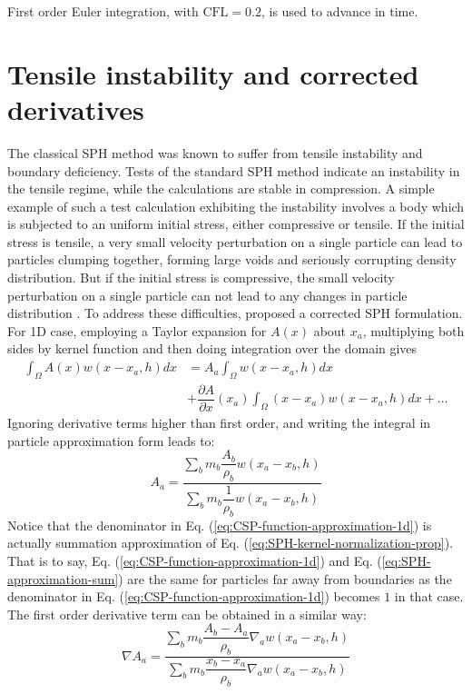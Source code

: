 First order Euler integration, with $\textrm{CFL} = 0.2$, is used to advance in time.

\section{Tensile instability and corrected derivatives}
The classical SPH method was known to suffer from tensile instability and boundary deficiency. Tests of the standard SPH method indicate an instability in the tensile regime, while the calculations are stable in compression.  A simple example of such a test calculation exhibiting the instability involves a body which is subjected to an uniform initial stress, either compressive or tensile. If the initial stress is tensile, a very small velocity perturbation on a single particle can lead to particles clumping together, forming large voids and seriously corrupting density distribution. But if the initial stress is compressive, the small velocity perturbation on a single particle can not lead to any changes in particle distribution \citep{swegle1995smoothed}. To address these difficulties, \citep{chen1999improvement} proposed a corrected SPH formulation. For 1D case, employing a Taylor expansion for $A\left(x\right)$ about $x_a$, multiplying both sides by kernel function and then doing integration over the domain gives
\begin{equation}
\begin{split}
\int_{\Omega} A\left(x\right) w\left(x- x_a, h\right) dx 
& = A_a \int_{\Omega} w\left(x - x_a, h\right) dx \\
&+\dfrac{\partial A}{\partial x}(x_a) \int_{\Omega} \left(x-x_a\right) w\left(x - x_a, h\right) dx +...
\end{split}
\end{equation}
Ignoring derivative terms higher than first order, and writing the integral in particle approximation form leads to:
\begin{equation}
A_a = \frac{\sum_b m_b \dfrac{A_b}{\rho_b} w\left(x_a-x_b, h\right)}{\sum_b m_b \dfrac{1}{\rho_b} w\left(x_a-x_b, h\right)}
\label{eq:CSP-function-approximation-1d}
\end{equation}
Notice that the denominator in Eq. (\ref{eq:CSP-function-approximation-1d}) is actually summation approximation of Eq. (\ref{eq:SPH-kernel-normalization-prop}). That is to say, Eq. (\ref{eq:CSP-function-approximation-1d}) and Eq. (\ref{eq:SPH-approximation-sum}) are the same for particles far away from boundaries as the denominator in Eq. (\ref{eq:CSP-function-approximation-1d}) becomes $1$ in that case.
The first order derivative term can be obtained in a similar way:
\begin{equation}
\nabla A_a = \frac{\sum_b m_b \dfrac{A_b - A_a}{\rho_b} \nabla_a w\left(x_a-x_b, h\right)}{\sum_b m_b \dfrac{x_b - x_a}{\rho_b} \nabla_a w\left(x_a-x_b, h\right)}
\end{equation}

